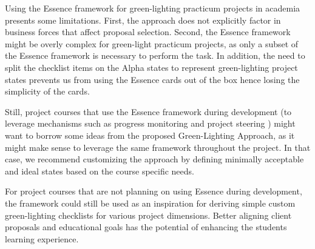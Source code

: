 Using the Essence framework for green-lighting practicum projects in academia presents some limitations. 
First, the approach does not explicitly factor in business forces that affect proposal selection. 
Second, the Essence framework might be overly complex for green-light practicum projects, 
as only a subset of the Essence framework is necessary to perform the task.
In addition, the need to split the checklist items on the Alpha states to represent green-lighting 
project states prevents us from using the Essence cards out of the box hence losing the simplicity of the cards.

Still, project courses that use the Essence framework during development (to leverage mechanisms such as progress 
monitoring and project steering \cite{ICSE2014}) might want to borrow some ideas from the proposed Green-Lighting Approach, 
as it might make sense to leverage the same framework throughout the project.
In that case, we recommend customizing the approach by defining minimally acceptable and ideal states based on the course specific needs. 

For project courses that are not planning on using Essence during development, 
the framework could still be used as an inspiration for deriving simple custom green-lighting checklists for various project dimensions. Better aligning client proposals and educational goals has the potential of enhancing the students learning experience.
